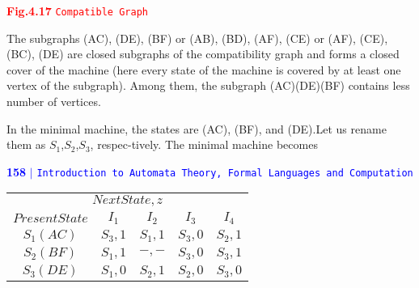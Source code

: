 \documentclass[a4]{article}
\begin{document}
\textcolor{red}{\centerline{\textbf{Fig.4.17} \hspace*{0.5cm} \texttt{Compatible Graph}}}
\vspace*{1cm}


\vspace*{0.2cm}


The subgraphs (AC), (DE), (BF) or (AB), (BD), (AF), (CE) or (AF), (CE), (BC), (DE) are closed subgraphs  of the compatibility graph and forms a closed cover of the machine (here every state of the machine is covered by at least one vertex of the subgraph). Among them, the subgraph (AC)(DE)(BF) contains less number of vertices.



In the minimal machine, the states are (AC), (BF), and (DE).Let us rename them as $S_1$,$S_2$,$S_3$, respec-tively. The minimal machine becomes

\newpage
  \begin{flushleft}
 \textcolor{blue}{\textbf{158}\hspace*{0.1cm} \textbf{$|$} \hspace*{0.1cm} \texttt{Introduction to Automata Theory, Formal Languages and Computation}}
  \end{flushleft}

\vspace*{2cm}

\begin{center}
\begin{tabular}{ccccc}
 \hline

 \hline

 \hline

 \hline

\multicolumn{5}{c}{$Next State, z$}\\
 \cline{2-5}
       $Present State$   &    $I_1$      &    $I_2$        &        $I_3$   &     $I_4$      \\
 \hline
       $S_1(AC)$         &    $S_3, 1$   &     $S_1, 1$    &     $S_3, 0$   &   $S_2, 1$     \\
       $S_2(BF)$         &    $S_1, 1$   &     $-, -$      &     $S_3, 0$   &   $S_3, 1$      \\
       $S_3(DE)$         &    $S_1, 0$   &     $S_2, 1$    &     $S_2, 0$   &   $S_3, 0$     \\
 \hline

 \hline

 \hline

 \hline
\end{tabular}
\end{center}
\end{document}
